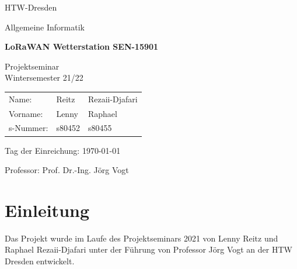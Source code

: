 \documentclass[12pt]{article}
\begin{document}
  \begin{titlepage}

    \begin{center}
      \Huge
  
      HTW-Dresden
  
      Allgemeine Informatik
  
      \bigskip
  
      \LARGE
  
      \vfill
  
      \huge
  
      \textbf{LoRaWAN Wetterstation SEN-15901}
  
      \LARGE
  
      \vfill
  
      Projektseminar\\
      Wintersemester 21/22
  
      \bigskip
  
    \end{center}
  
    \vfill
  
    \Large

  
    \vspace*{2\bigskipamount}
  
    \centering

    \begingroup
      \setlength{\tabcolsep}{12pt}
      \begin{tabular}{lll}
        Name:     & Reitz   & Rezaii-Djafari\\[2.0ex]
        Vorname:  & Lenny   & Raphael\\[2.0ex]
        s-Nummer: & s80452  & s80455
      \end{tabular}
    \endgroup
  
    \vspace*{4\bigskipamount}
  

    Tag der Einreichung: \today
  
    \vspace*{2\bigskipamount}
  
    Professor: Prof. Dr.-Ing. Jörg Vogt 
  
  \end{titlepage}

  \newpage


  \tableofcontents


  \newpage


  \section{Einleitung}
    Das Projekt wurde im Laufe des Projektseminars 2021 von Lenny Reitz und Raphael Rezaii-Djafari unter der Führung von
    Professor Jörg Vogt an der HTW Dresden entwickelt.
\end{document}
